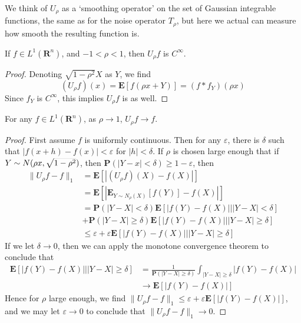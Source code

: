 We think of $U_\rho$ as a `smoothing operator' on the set of Gaussian integrable functions, the same as for the noise operator $T_\rho$, but here we actual can measure how smooth the resulting function is.

\begin{theorem}
    If $f \in L^1(\mathbf{R}^n)$, and $-1 < \rho < 1$, then $U_\rho f$ is $C^\infty$.
\end{theorem}
\begin{proof}
    Denoting $\sqrt{1 - \rho^2} X$ as $Y$, we find
    \[ (U_\rho f) \left( x \right) = \mathbf{E} \left[ f \left( \rho x + Y \right) \right] = (f * f_Y)(\rho x) \]
    Since $f_Y$ is $C^\infty$, this implies $U_\rho f$ is as well.
\end{proof}

\begin{theorem}
    For any $f \in L^1(\mathbf{R}^n)$, as $\rho \to 1$, $U_\rho f \to f$.
\end{theorem}
\begin{proof}
    First assume $f$ is uniformly continuous. Then for any $\varepsilon$, there is $\delta$ such that $|f(x + h) - f(x)| < \varepsilon$ for $|h| < \delta$. If $\rho$ is chosen large enough that if $Y \sim \smash{N( \rho x ,\sqrt{1 - \rho^2})}$, then $\mathbf{P}(|Y - x| < \delta) \geq 1 - \varepsilon$, then
    \begin{align*}
        \| U_\rho f - f \|_1 &= \mathbf{E} \left[ |(U_\rho f)(X) - f(X)|  \right]\\
        &= \mathbf{E} \left[ |\mathbf{E}_{Y \sim N_\rho(X)}[f(Y)] - f(X)| \right]\\
        &= \mathbf{P}(|Y - X| < \delta) \mathbf{E}[|f(Y) - f(X)| | |Y - X| < \delta]\\
        &+ \mathbf{P}(|Y - X| \geq \delta) \mathbf{E}[|f(Y) - f(X)| | |Y - X| \geq \delta]\\
        &\leq \varepsilon + \varepsilon \mathbf{E}[|f(Y) - f(X)|  |  |Y - X| \geq \delta]
    \end{align*}
    If we let $\delta \to 0$, then we can apply the monotone convergence theorem to conclude that
    \begin{align*}
        \mathbf{E} \left[ |f(Y) - f(X)| | |Y - X| \geq \delta \right] &= \frac{1}{\mathbf{P}(|Y-X| \geq \delta)} \int_{|Y - X| \geq \delta} |f(Y) - f(X)|\\
        &\to \mathbf{E}[|f(Y) - f(X)|]
    \end{align*}
    Hence for $\rho$ large enough, we find $\| U_\rho f - f \|_1 \leq \varepsilon + \varepsilon \mathbf{E}[|f(Y) - f(X)|]$, and we may let $\varepsilon \to 0$ to conclude that $\| U_\rho f - f \|_1 \to 0$.
\end{proof}

